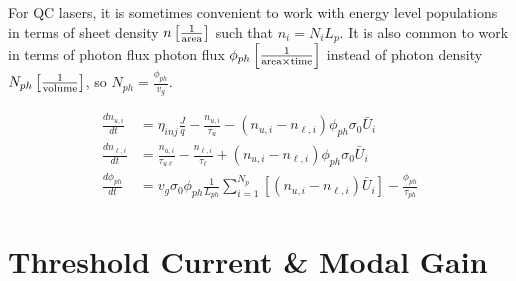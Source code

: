 {For QC lasers, it is sometimes convenient to work with energy level populations in terms of sheet density $n \left[\frac{1}{\textnormal{area}}\right]$ such that $n_i=N_i L_p$.  It is also common to work in terms of photon flux photon flux $\phi_{ph} \left[\frac{1}{\textnormal{area}\times\textnormal{time}}\right]$ instead of photon density $N_{ph} \left[\frac{1}{\textnormal{volume}}\right]$, so $N_{ph}=\frac{\phi_{ph}}{v_g}$.

\begin{subequations}
\label{chpt1eqn:req_sheet}
\begin{align}
\frac{d n_{u,i}}{dt}&=\eta_\textit{inj} \frac{J}{q} - \frac{n_{u,i}}{\tau_u} - \left( n_{u,i} - n_{\ell,i}\right) \phi_{ph} \sigma_0 \bar{U}_i
\label{chpt1eqn:req_sheeta}\\
%
\frac{d n_{\ell,i}}{dt}&=\frac{n_{u,i}}{\tau_{u\ell}}-\frac{n_{\ell,i}}{\tau_\ell} + \left( n_{u,i} - n_{\ell,i}\right) \phi_{ph} \sigma_0 \bar{U}_i
\label{chpt1eqn:req_sheetb}\\
%
\frac{d \phi_{ph}}{dt}&=v_g \sigma_0 \phi_{ph} \frac{1}{L_{ph}} \sum_{i=1}^{N_p}\left[ \left(n_{u,i} - n_{\ell,i}\right) \bar{U}_i \right] - \frac{\phi_{ph}}{\tau_{ph}}
\label{chpt1eqn:req_sheetc}
\end{align}
\end{subequations}

\section{Threshold Current \& Modal Gain}


}
